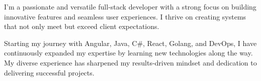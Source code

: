 I'm a passionate and versatile full-stack developer with a strong focus on building innovative features and seamless user experiences.  
I thrive on creating systems that not only meet but exceed client expectations.  

Starting my journey with Angular, Java, C\#, React, Golang, and DevOps, I have continuously expanded my expertise by learning new technologies along the way.  
My diverse experience has sharpened my results-driven mindset and dedication to delivering successful projects.  

\vspace{\baselineskip}  

